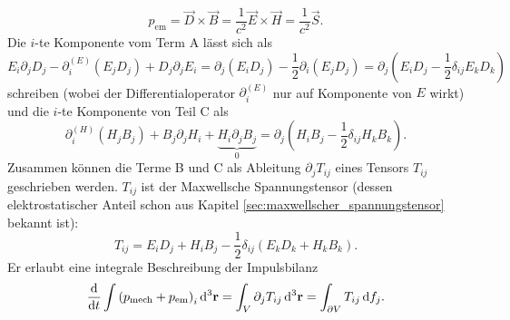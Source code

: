 \begin{equation*}
	p_{\mathrm{em}}=\vec {D}\times \vec {B}=\frac{1}{c^{2}}\vec {E}\times \vec {H}=\frac{1}{c^{2}}\vec {S}.
\end{equation*}
Die $i$-te Komponente vom Term A lässt sich als
\begin{equation*}
	E_{i}\partial _{j}D_{j}-\partial _{i}^{\left(E\right)}\left(E_{j}D_{j}\right)+D_{j}\partial _{j}E_{i}=\partial _{j}\left(E_{i}D_{j}\right)-\frac{1}{2}\partial _{i}\left(E_{j}D_{j}\right)=\partial _{j}\left(E_{i}D_{j}-\frac{1}{2}\delta _{ij}E_{k}D_{k}\right)
\end{equation*}
schreiben (wobei der Differentialoperator $\partial _{i}^{\left(E\right)}$ nur auf Komponente von $E$ wirkt) und die $i$-te Komponente von Teil C als
\begin{equation*}
	\partial _{i}^{\left(H\right)}\left(H_{j}B_{j}\right)+B_{j}\partial _{j}H_{i}+\underset{0}{\underbrace{H_{i}\partial _{j}B_{j}}}=\partial _{j}\left(H_{i}B_{j}-\frac{1}{2}\delta _{ij}H_{k}B_{k}\right).
\end{equation*}
Zusammen können die Terme B und C als Ableitung $\partial _{j}T_{ij}$ eines Tensors $T_{ij}$ geschrieben werden. $T_{ij}$ ist der Maxwellsche Spannungstensor (dessen elektrostatischer Anteil schon aus Kapitel \ref{sec:maxwellscher_spannungstensor} bekannt ist):
\begin{equation*}
	T_{ij}=E_{i}D_{j}+H_{i}B_{j}-\frac{1}{2}\delta _{ij}\left(E_{k}D_{k}+H_{k}B_{k}\right).
\end{equation*}
Er erlaubt eine integrale Beschreibung der Impulsbilanz
\begin{equation*}
	\frac{\diff }{\diff t}\int \left(p_{\mathrm{mech}}+p_{\mathrm{em}}\right)_{i}\diffa[3]{\vec{r}}=\int _{V}\partial _{j}T_{ij}\diffa[3]{\vec{r}}=\int _{\partial V}T_{ij}\diff f_{j}.
\end{equation*}
